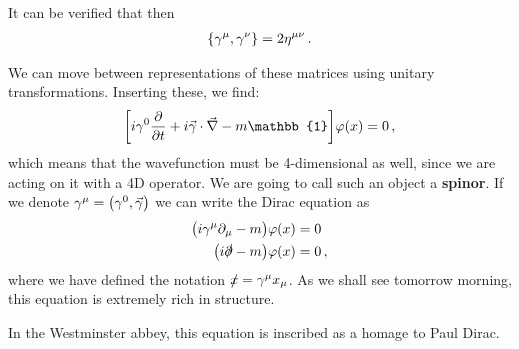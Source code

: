 \documentclass[main.tex]{subfiles}
\begin{document}
It can be verified that then 
%
\begin{align}
\qty{\gamma^{\mu }, \gamma^{\nu }} = 2 \eta^{\mu \nu }
\,.
\end{align}

We can move between representations of these matrices using unitary transformations. 
Inserting these, we find: 
%
\begin{align}
\qty[ i \gamma^{0} \pdv{}{t} + i \vec{\gamma} \cdot \vec{\nabla} - m \mathbb{1}] \varphi (x) = 0
\,,
\end{align}
%
which means that the wavefunction must be 4-dimensional as well, since we are acting on it with a 4D operator. 
We are going to call such an object a \textbf{spinor}. 
If we denote \(\gamma^{\mu } = \qty(\gamma^{0}, \vec{\gamma}) \) we can write the Dirac equation as 
%
\begin{subequations}
\begin{align}
\qty(i \gamma^{\mu }\partial_{\mu } - m) \varphi (x) &= 0  \\
\qty(i \slashed{\partial} - m ) \varphi (x) &= 0
\,,
\end{align}
\end{subequations}
%
where we have defined the notation \(\slashed{x} = \gamma^{\mu } x_{\mu }\). 
As we shall see tomorrow morning, this equation is extremely rich in structure. 

In the Westminster abbey, this equation is inscribed as a homage to Paul Dirac.
\end{document}
